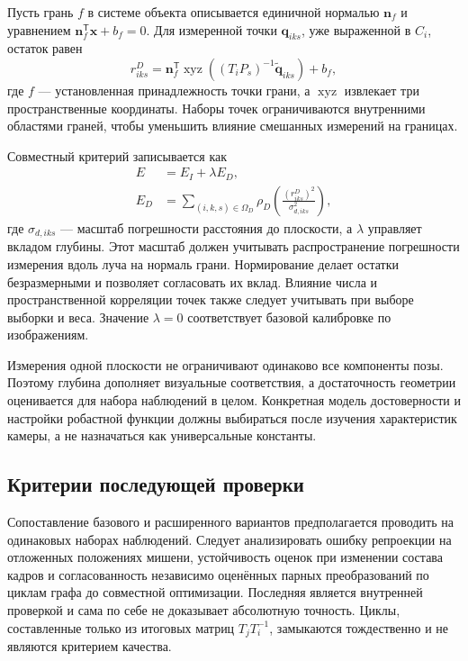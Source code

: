 Пусть грань $f$ в системе объекта описывается единичной нормалью $\mathbf n_f$ и уравнением $\mathbf n_f^\mathsf T\mathbf x+b_f=0$. Для измеренной точки $\mathbf q_{iks}$, уже выраженной в $C_i$, остаток равен
\begin{equation}
  r^D_{iks}=\mathbf n_f^\mathsf T
    \operatorname{xyz}\!\left((T_iP_s)^{-1}
      \widetilde{\mathbf q}_{iks}\right)+b_f,
\end{equation}
где $f$ --- установленная принадлежность точки грани, а $\operatorname{xyz}$ извлекает три пространственные координаты. Наборы точек ограничиваются внутренними областями граней, чтобы уменьшить влияние смешанных измерений на границах.

Совместный критерий записывается как
\begin{align}
  E &= E_I+\lambda E_D,\\
  E_D &=\sum_{(i,k,s)\in\Omega_D}
    \rho_D\!\left(\frac{(r^D_{iks})^2}{\sigma_{d,iks}^2}\right),
\end{align}
где $\sigma_{d,iks}$ --- масштаб погрешности расстояния до плоскости, а $\lambda$ управляет вкладом глубины. Этот масштаб должен учитывать распространение погрешности измерения вдоль луча на нормаль грани. Нормирование делает остатки безразмерными и позволяет согласовать их вклад. Влияние числа и пространственной корреляции точек также следует учитывать при выборе выборки и веса. Значение $\lambda=0$ соответствует базовой калибровке по изображениям.

Измерения одной плоскости не ограничивают одинаково все компоненты позы. Поэтому глубина дополняет визуальные соответствия, а достаточность геометрии оценивается для набора наблюдений в целом. Конкретная модель достоверности и настройки робастной функции должны выбираться после изучения характеристик камеры, а не назначаться как универсальные константы.

\subsection{Критерии последующей проверки}

Сопоставление базового и расширенного вариантов предполагается проводить на одинаковых наборах наблюдений. Следует анализировать ошибку репроекции на отложенных положениях мишени, устойчивость оценок при изменении состава кадров и согласованность независимо оценённых парных преобразований по циклам графа до совместной оптимизации. Последняя является внутренней проверкой и сама по себе не доказывает абсолютную точность. Циклы, составленные только из итоговых матриц $T_jT_i^{-1}$, замыкаются тождественно и не являются критерием качества.

